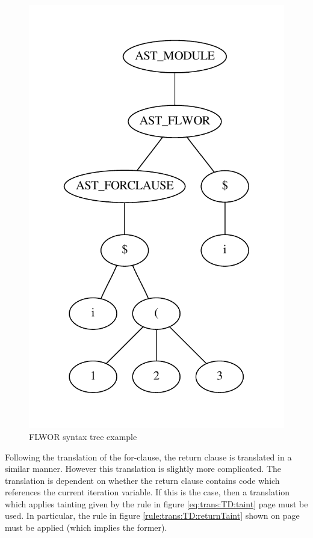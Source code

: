 \begin{figure}[!htp]
\begin{center}
  \includegraphics[scale=0.4]{img/graphs/flwor2}
  \caption{FLWOR syntax tree example}
  \label{fig:impl:td:flwor2}
\end{center}
\end{figure}

Following the translation of the for-clause, the return clause is translated in
a similar manner. However this translation is slightly more complicated. The
translation is dependent on whether the return clause contains code which
references the current iteration variable. If this is the case, then a
translation which applies tainting given by the rule in figure
\ref{eq:trans:TD:taint} page \pageref{eq:trans:TD:taint} must be used. In
particular, the rule in figure \ref{rule:trans:TD:returnTaint} shown on page
\pageref{rule:trans:TD:returnTaint} must be applied (which implies the former).


